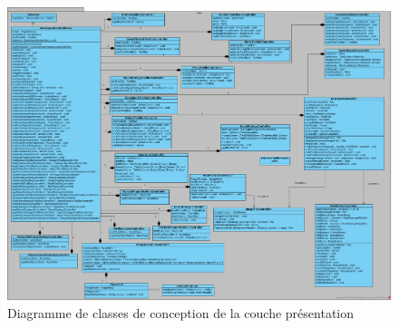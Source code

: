 \begin{figure}[htpb]
    \centering
    \includegraphics[scale=0.35]{fig/classe_conception_view.png}
    \caption{Diagramme de classes de conception de la couche présentation}
    \label{fig:vue_classes_conception_diag}
\end{figure}

